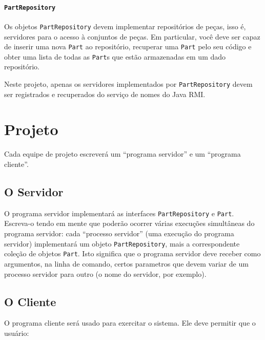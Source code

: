 \documentclass[oneside,12pt,a4paper]{memoir}
\begin{document}
\paragraph{\texttt{PartRepository}}

Os objetos \texttt{PartRepository} devem implementar repositórios de
peças, isso é, servidores para o acesso à conjuntos de peças. Em
particular, você deve ser capaz de inserir uma nova \texttt{Part} ao
repositório, recuperar uma \texttt{Part} pelo seu código e obter uma
lista de todas as \texttt{Part}s que estão armazenadas em um dado
repositório.

Neste projeto, apenas os servidores implementados por
\texttt{PartRepository} devem ser registrados e recuperados do serviço
de nomes do Java RMI.

\section*{Projeto}

Cada equipe de projeto escreverá um ``programa servidor'' e um
``programa cliente''.

\subsection*{O Servidor}

O programa servidor implementará as interfaces \texttt{PartRepository}
e \texttt{Part}. Escreva-o tendo em mente que poderão ocorrer várias
execuções simultâneas do programa servidor: cada ``processo servidor''
(uma execução do programa servidor) implementará um objeto
\texttt{PartRepository}, mais a correspondente coleção de objetos
\texttt{Part}. Isto significa que o programa servidor deve receber
como argumentos, na linha de comando, certos parametros que devem
variar de um processo servidor para outro (o nome do servidor, por
exemplo).

\subsection*{O Cliente}

O programa cliente será usado para exercitar o sistema. Ele deve
permitir que o usuário:
\end{document}
